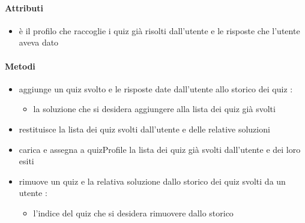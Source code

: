 \paragraph{Attributi}
\begin{itemize}
\item {}
\newline
è il profilo che raccoglie i quiz già risolti dall'utente e le risposte che l'utente aveva dato
\end{itemize}
\paragraph{Metodi}
\begin{itemize}
\item {}
\newline
aggiunge un quiz svolto e le risposte date dall'utente allo storico dei quiz
\newline
{} :
\begin{itemize}
\item {}
\newline
la soluzione che si desidera aggiungere alla lista dei quiz già svolti
\end{itemize}
\item {}
\newline
restituisce la lista dei quiz svolti dall'utente e delle relative soluzioni
\newline
\item {}
\newline
carica e assegna a quizProfile la lista dei quiz già svolti dall'utente e dei loro esiti
\newline
\item {}
\newline
rimuove un quiz e la relativa soluzione dallo storico dei quiz svolti da un utente
\newline
{} :
\begin{itemize}
\item {}
\newline
l'indice del quiz che si desidera rimuovere dallo storico
\end{itemize}
\end{itemize}
